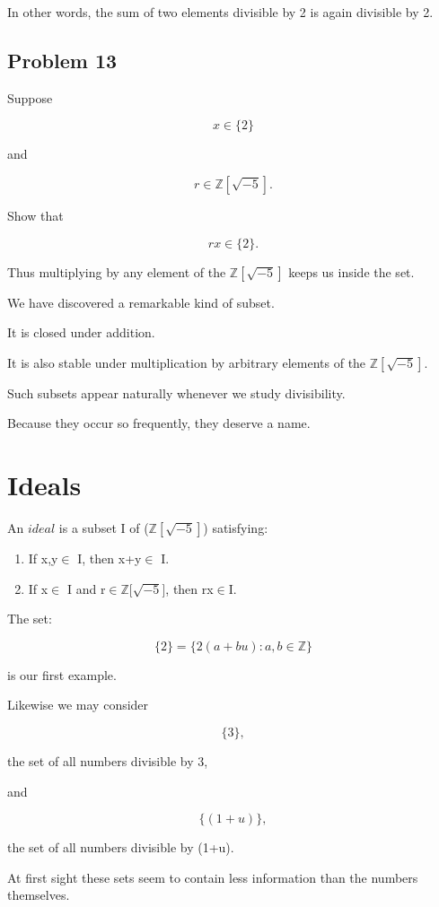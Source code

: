 In other words, the sum of two elements divisible by 2 is again divisible by 2.

\subsection{Problem 13}

Suppose

\[
x\in\{2\}
\]

and

\[
r\in\mathbb Z[\sqrt{-5}].
\]

Show that

\[
rx\in\{2\}.
\]

Thus multiplying by any element of the $\mathbb Z[\sqrt{-5}]$ keeps us inside the set.

We have discovered a remarkable kind of subset.

It is closed under addition.

It is also stable under multiplication by arbitrary elements of the $\mathbb Z[\sqrt{-5}]$.

Such subsets appear naturally whenever we study divisibility.

Because they occur so frequently, they deserve a name.

\section{Ideals}

An $\textit{ideal}$ is a subset I of ($\mathbb Z[\sqrt{-5}]$) satisfying:

\begin{enumerate}
\item If x,y$\in$ I, then x+y$\in$ I.
\item If x$\in$ I and r$\in\mathbb Z[\sqrt{-5}$], then rx$\in $I.
\end{enumerate}

The set:

\[
\{2\} = \{2(a+bu):a,b\in\mathbb Z\}
\]

is our first example.

Likewise we may consider

\[
\{3\},
\]

the set of all numbers divisible by 3,

and

\[
\{(1+u)\},
\]

the set of all numbers divisible by (1+u).

At first sight these sets seem to contain less information than the numbers themselves.

